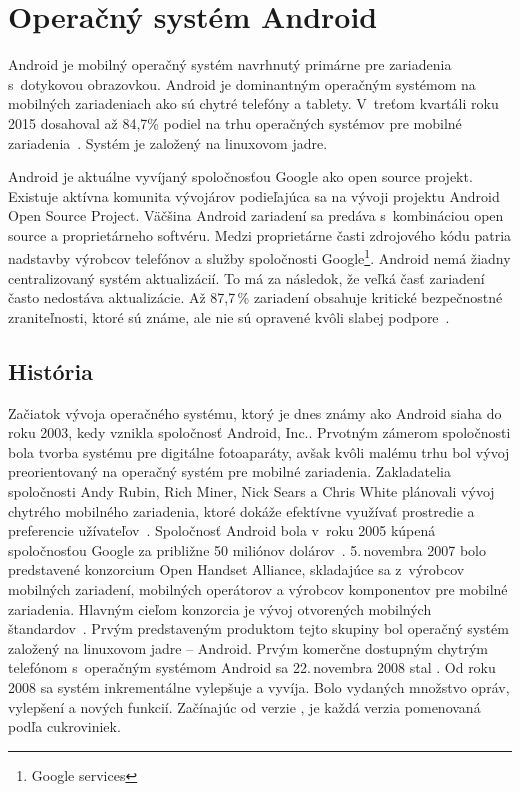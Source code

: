 \chapter{Operačný systém Android}
Android je mobilný operačný systém navrhnutý primárne pre zariadenia s~dotykovou obrazovkou. Android je dominantným operačným systémom na mobilných zariadeniach ako sú chytré telefóny a tablety. V~treťom kvartáli roku 2015 dosahoval až 84,7\% podiel na trhu operačných systémov pre mobilné zariadenia~\cite{Westenberg2015}. Systém je založený na linuxovom jadre.

Android je aktuálne vyvíjaný spoločnosťou Google ako open source projekt. Existuje aktívna komunita vývojárov podieľajúca sa na vývoji projektu Android Open Source Project. Väčšina Android zariadení sa predáva s~kombináciou open source a proprietárneho softvéru. Medzi proprietárne časti zdrojového kódu patria nadstavby výrobcov telefónov a služby spoločnosti Google\footnote{Google services}. Android nemá žiadny centralizovaný systém aktualizácií. To má za následok, že veľká časť zariadení často nedostáva aktualizácie. Až 87,7\,\% zariadení obsahuje kritické bezpečnostné zraniteľnosti, ktoré sú známe, ale nie sú opravené kvôli slabej podpore~\cite{Thomas2015}.


\section{História}
Začiatok vývoja operačného systému, ktorý je dnes známy ako Android siaha do roku 2003, kedy vznikla spoločnosť Android, Inc.. Prvotným zámerom spoločnosti bola tvorba systému pre digitálne fotoaparáty, avšak kvôli malému trhu bol vývoj preorientovaný na operačný systém pre mobilné zariadenia. Zakladatelia spoločnosti Andy Rubin, Rich Miner, Nick Sears  a Chris White plánovali vývoj chytrého mobilného zariadenia, ktoré dokáže efektívne využívať prostredie a preferencie užívateľov~\cite{Beavis2008}. Spoločnosť Android bola v~roku 2005 kúpená spoločnosťou Google za približne 50 miliónov dolárov~\cite{Rosoff2011}. 5.\,novembra 2007 bolo predstavené konzorcium Open Handset Alliance, skladajúce sa z~výrobcov mobilných zariadení, mobilných operátorov a výrobcov komponentov pre mobilné zariadenia. Hlavným cieľom konzorcia je vývoj otvorených mobilných štandardov~\cite{OHA}. Prvým predstaveným produktom tejto skupiny bol operačný systém založený na linuxovom jadre -- Android. Prvým komerčne dostupným chytrým telefónom s~operačným systémom Android sa 22.\,novembra 2008 stal . Od roku 2008 sa systém inkrementálne vylepšuje a vyvíja. Bolo vydaných množstvo opráv, vylepšení a nových funkcií. Začínajúc od verzie , je každá verzia pomenovaná podľa cukroviniek.

